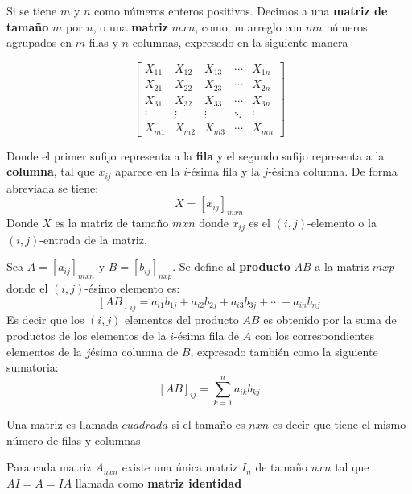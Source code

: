 \begin{defi}\citep{Blyth_2002}
    Si se tiene $m$ y $n$ como números enteros positivos. Decimos a una \textbf{matriz de tamaño} $m$ por $n$, o una \textbf{matriz} $mxn$, como un arreglo con $mn$ números agrupados en $m$ filas y $n$ columnas, expresado en la siguiente manera

    $$
    \begin{bmatrix}
        X_{11} & X_{12} & X_{13} & \cdots & X_{1n} \\
        X_{21} & X_{22} & X_{23} & \cdots & X_{2n} \\
        X_{31} & X_{32} & X_{33} & \cdots & X_{3n} \\
        \vdots & \vdots & \vdots & \ddots & \vdots \\
        X_{m1} & X_{m2} & X_{m3} & \cdots & X_{mn}
    \end{bmatrix}
    $$

    Donde el primer sufijo representa a la \textbf{fila} y el segundo sufijo representa a la \textbf{columna}, tal que $x_{ij}$ aparece en la $i$-\'esima fila y la $j$-\'esima columna. De forma abreviada se tiene:
    $$X={\left[x_{ij} \right]}_{mxn}$$
    Donde $X$ es la matriz de tamaño $mxn$  donde $x_{ij}$ es el $(i,j)$-elemento o la $(i,j)$-entrada de la matriz.

\end{defi}

\begin{defi}\citep{Blyth_2002}
    Sea $A={\left[a_{ij} \right]}_{mxn}$ y $B={\left[b_{ij} \right]}_{nxp}$. Se define al \textbf{producto} $AB$ a la matriz $mxp$ donde el $(i,j)$-ésimo elemento es:
    $${\left[AB \right]}_{ij}=a_{i1}b_{1j}+a_{i2}b_{2j}+a_{i3}b_{3j}+\cdots+a_{in}b_{nj}$$ 
    Es decir que los $(i,j)$ elementos del producto $AB$ es obtenido por la suma de productos de los elementos de la $i$-\'esima fila de $A$ con los correspondientes elementos de la $j$\'esima columna de $B$, expresado también como la siguiente sumatoria:
    $${\left[AB \right]}_{ij}=\sum\limits_{k = 1}^{n}a_{ik}b_{kj}$$
\end{defi}

\begin{defi}\citep{Blyth_2002}
    Una matriz es llamada $cuadrada$ si el tamaño es $nxn$ es decir que tiene el mismo número de filas y columnas
\end{defi}

\begin{defi}\citep{Blyth_2002}
    Para cada matriz $A_{nxn}$ existe una única matriz $I_{n}$ de tamaño $nxn$ tal que $AI=A=IA$ llamada como \textbf{matriz identidad}  
\end{defi}

